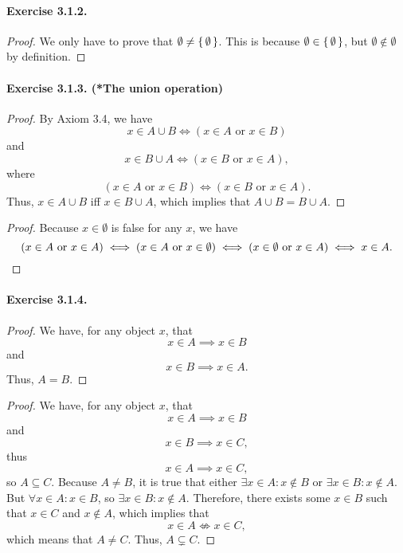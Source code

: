 \paragraph{Exercise 3.1.2.}
\begin{proof}
    We only have to prove that $\emptyset \neq \set{\emptyset}$. This is because $\emptyset \in \set{\emptyset}$, but $\emptyset \notin \emptyset$ by definition.
\end{proof}

\paragraph{Exercise 3.1.3. (*The union operation)}
\begin{proof}
    By Axiom 3.4, we have \[x\in A\cup B \iff (x\in A \text{ or } x\in B)\] and \[x\in B\cup A \iff (x\in B \text{ or } x\in A),\] where \[(x\in A \text{ or } x\in B) \iff (x\in B \text{ or } x\in A).\] Thus, $x\in A\cup B$ iff $x\in B\cup A$, which implies that $A\cup B=B\cup A$.
\end{proof}
\begin{proof}
    Because $x\in \emptyset$ is false for any $x$, we have \[(x\in A \text{ or } x\in A) \iff (x\in A \text{ or } x\in \emptyset) \iff (x\in \emptyset \text{ or } x\in A) \iff x\in A. \qedhere\]
\end{proof}

\paragraph{Exercise 3.1.4.}
\begin{proof}
    We have, for any object $x$, that \[ x\in A \implies x \in B \] and \[ x\in B \implies x \in A .\] Thus, $A=B$.
\end{proof}
\begin{proof}
    We have, for any object $x$, that \[ x\in A \implies x \in B \] and \[ x\in B \implies x \in C , \] thus \[ x\in A \implies x \in C ,\] so $A\subseteq C$. Because $A\neq B$, it is true that either $\exists x\in A: x\notin B$ or $\exists x\in B: x\notin A$. But $\forall x\in A: x \in B$, so $\exists x\in B: x\notin A$. Therefore, there exists some $x\in B$ such that $x\in C$ and $x\notin A$, which implies that \[ x\in A \not\iff x\in C ,\] which means that $A\neq C$. Thus, $A\subsetneq C$.
\end{proof}

